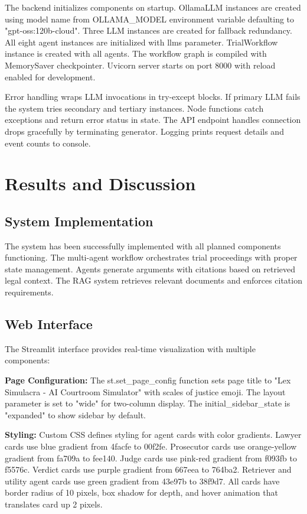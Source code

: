 \documentclass[12pt,singleside,a4paper]{article}
\begin{document}
The backend initializes components on startup. OllamaLLM instances are created using model name from OLLAMA\_MODEL environment variable defaulting to "gpt-oss:120b-cloud". Three LLM instances are created for fallback redundancy. All eight agent instances are initialized with llms parameter. TrialWorkflow instance is created with all agents. The workflow graph is compiled with MemorySaver checkpointer. Uvicorn server starts on port 8000 with reload enabled for development.

Error handling wraps LLM invocations in try-except blocks. If primary LLM fails the system tries secondary and tertiary instances. Node functions catch exceptions and return error status in state. The API endpoint handles connection drops gracefully by terminating generator. Logging prints request details and event counts to console.

\pagebreak
\section{Results and Discussion}

\subsection{System Implementation}
The system has been successfully implemented with all planned components functioning. The multi-agent workflow orchestrates trial proceedings with proper state management. Agents generate arguments with citations based on retrieved legal context. The RAG system retrieves relevant documents and enforces citation requirements.

\subsection{Web Interface}
The Streamlit interface provides real-time visualization with multiple components:

\textbf{Page Configuration:} The st.set\_page\_config function sets page title to "Lex Simulacra - AI Courtroom Simulator" with scales of justice emoji. The layout parameter is set to "wide" for two-column display. The initial\_sidebar\_state is "expanded" to show sidebar by default.

\textbf{Styling:} Custom CSS defines styling for agent cards with color gradients. Lawyer cards use blue gradient from 4facfe to 00f2fe. Prosecutor cards use orange-yellow gradient from fa709a to fee140. Judge cards use pink-red gradient from f093fb to f5576c. Verdict cards use purple gradient from 667eea to 764ba2. Retriever and utility agent cards use green gradient from 43e97b to 38f9d7. All cards have border radius of 10 pixels, box shadow for depth, and hover animation that translates card up 2 pixels.
\end{document}
